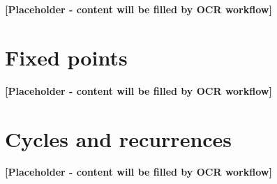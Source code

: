 \documentclass{article}
\theoremstyle{plain}
\theoremstyle{definition}
\theoremstyle{remark}
\begin{document}
\textbf{[Placeholder - content will be filled by OCR workflow]}

\section{Fixed points} \label{sec:fixedpoints}

%
%
%
%
%
%

\textbf{[Placeholder - content will be filled by OCR workflow]}

\section{Cycles and recurrences} \label{sec:cycles}

%
%

\textbf{[Placeholder - content will be filled by OCR workflow]}
\end{document}

